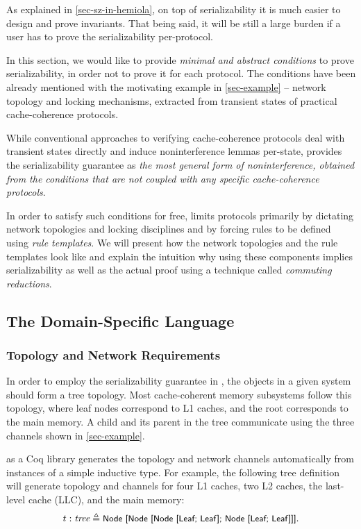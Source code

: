 \documentclass[sigplan,10pt,review,anonymous,screen]{acmart}\settopmatter{printfolios=true,printccs=false,printacmref=false}
\begin{document}
As explained in \autoref{sec-sz-in-hemiola}, on top of serializability it is much easier to design and prove invariants.
That being said, it will be still a large burden if a user has to prove the serializability per-protocol.

In this section, we would like to provide \emph{minimal and abstract conditions} to prove serializability, in order not to prove it for each protocol.
The conditions have been already mentioned with the motivating example in \autoref{sec-example} -- network topology and locking mechanisms, extracted from transient states of practical cache-coherence protocols.

While conventional approaches to verifying cache-coherence protocols deal with transient states directly and induce noninterference lemmas per-state, \hemiola{} provides the serializability guarantee as \emph{the most general form of noninterference, obtained from the conditions that are not coupled with any specific cache-coherence protocols}.

In order to satisfy such conditions for free, \hemiola{} limits protocols primarily by dictating network topologies and locking disciplines and by forcing rules to be defined using \emph{rule templates}.
We will present how the network topologies and the rule templates look like and explain the intuition why using these components implies serializability as well as the actual proof using a technique called \emph{commuting reductions}.

\subsection{The Domain-Specific Language}
\label{sec-dsl}

\subsubsection{Topology and Network Requirements}
\label{sec-topo-net-reqs}

In order to employ the serializability guarantee in \hemiola{}, the objects in a given system should form a tree topology.
Most cache-coherent memory subsystems follow this topology, where leaf nodes correspond to L1 caches, and the root corresponds to the main memory.
A child and its parent in the tree communicate using the three channels shown in \autoref{sec-example}.

\hemiola{} as a Coq library generates the topology and network channels automatically from instances of a simple inductive type.
For example, the following tree definition will generate topology and channels for four L1 caches, two L2 caches, the last-level cache (LLC), and the main memory:
\begin{displaymath}
  t : \textit{tree} \triangleq \small{\textsf{Node [Node [Node [Leaf; Leaf]; Node [Leaf; Leaf]]]}}.
\end{displaymath}
\end{document}
